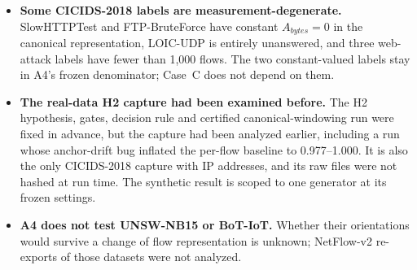 \documentclass[preprint,12pt]{elsarticle}
\begin{document}
\begin{itemize}
\item \textbf{Some CICIDS-2018 labels are measurement-degenerate.} SlowHTTPTest and FTP-BruteForce have constant $A_{bytes}=0$ in the canonical representation, LOIC-UDP is entirely unanswered, and three web-attack labels have fewer than 1{,}000 flows. The two constant-valued labels stay in A4's frozen denominator; Case~C does not depend on them.
\item \textbf{The real-data H2 capture had been examined before.} The H2 hypothesis, gates, decision rule and certified canonical-windowing run were fixed in advance, but the capture had been analyzed earlier, including a run whose anchor-drift bug inflated the per-flow baseline to 0.977--1.000. It is also the only CICIDS-2018 capture with IP addresses, and its raw files were not hashed at run time. The synthetic result is scoped to one generator at its frozen settings.
\item \textbf{A4 does not test UNSW-NB15 or BoT-IoT.} Whether their orientations would survive a change of flow representation is unknown; NetFlow-v2 re-exports of those datasets were not analyzed.
\end{itemize}




\end{document}
